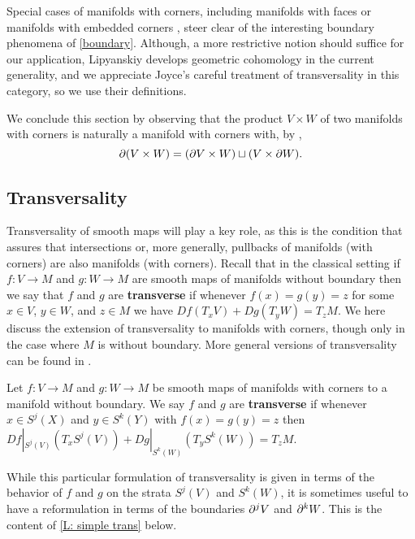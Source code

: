 \begin{comment}
\end{comment}

Special cases of manifolds with corners, including
manifolds with faces or manifolds with embedded corners \cite{Joy12}, steer clear of the interesting boundary phenomena of \cref{boundary}.
Although, a more restrictive notion should suffice for our application, Lipyanskiy develops geometric cohomology in the current generality, and we appreciate Joyce's careful treatment of transversality in this category, so we use their definitions.

We conclude this section by observing that the product $V \times W$ of two manifolds with corners is naturally a manifold with corners with, by \cite[Proposition 2.12]{Joy12},
$$\partial (V \times W) = (\partial V \times W) \sqcup (V \times \partial W).$$

\subsection{Transversality}

Transversality of smooth maps will play a key role, as this is the condition that assures that intersections or, more generally, pullbacks of manifolds (with corners) are also manifolds (with corners).
Recall that in the classical setting if $f \colon V \to M$ and $g \colon W \to M$ are smooth maps of manifolds without boundary then we say that $f$ and $g$ are \textbf{transverse} if whenever $f(x) = g(y) = z$ for some $x \in V$, $y \in W$, and $z \in M$ we have $Df(T_xV)+Dg(T_yW) = T_z M$.
We here discuss the extension of transversality to manifolds with corners, though only in the case where $M$ is without boundary.
More general versions of transversality can be found in \cite[Section 6]{Joy12}.

\begin{definition}{\cite[Special case of Definition 6.1]{Joy12}}
	Let $f \colon V \to M$ and $g \colon W \to M$ be smooth maps of manifolds with corners to a manifold without boundary.
	We say $f$ and $g$ are \textbf{transverse} if whenever $x \in S^j(X)$ and $y \in S^k(Y)$ with $f(x) = g(y) = z$ then $Df|_{S^j(V)}(T_xS^j(V))+Dg|_{S^k(W)}(T_yS^k(W)) = T_zM$.
\end{definition}

While this particular formulation of transversality is given in terms of the behavior of $f$ and $g$ on the strata $S^j(V)$ and $S^k(W)$, it is sometimes useful to have a reformulation in terms of the boundaries $\partial^j V$ and $\partial^kW$.
This is the content of \cref{L: simple trans} below.

